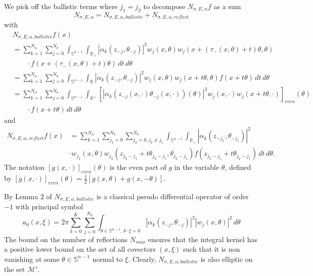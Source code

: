 \documentclass[10pt]{amsart}
\theoremstyle{definition}
\theoremstyle{definition}
\theoremstyle{definition}
\newcommand{ \rn }[1]{\mathbb{R}^{#1}}
\begin{document}
We pick off the ballistic terms where $j_{1}=j_{2}$ to decompose $N_{\sigma,E,\alpha}f$ as a sum
\begin{equation*}
N_{\sigma,E,\alpha} = N_{\sigma,E,\alpha, ballistic} + N_{\sigma,E,\alpha,reflect}
\end{equation*}
with
\begin{align*}
& N_{\sigma,E,\alpha,ballistic}f(x)\\
& = \sum_{k=1}^{N_{\alpha}}\sum_{j=0}^{N_{k}}\int_{\mathbb{S}^{n-1}}\int_{\mathbb{R}_{+}} |\alpha_{k}(z_{-j}, \theta_{-j})|^{2} w_{j}\left( x,\theta \right) w_{j}\left(x + (\tau_{-}(x,\theta)+t)\theta, \theta\right)\\
& \qquad \cdot f\left(x + (\tau_{-}(x,\theta)+t)\theta \right)\, dt\,d\theta\\
& = \sum_{k=1}^{N_{\alpha}}\sum_{j=0}^{N_k}\int_{\mathbb{S}^{n-1}}\int_{\mathbb{R}} |\alpha_{k}(z_{-j}, \theta_{-j})|^{2} w_{j}\left( x,\theta \right) w_{j}\left(x + t\theta, \theta\right)f\left(x + t\theta \right)\, dt\,d\theta\\
& = \sum_{k=1}^{N_{\alpha}}\sum_{j=0}^{N_k}\int_{\mathbb{S}^{n-1}}\int_{\rn{+}} \left[ |\alpha_{k}(z_{-j}(x,\cdot) \theta_{-j}(x,\cdot))(\theta)|^{2} w_{j}\left( x,\cdot \right) w_{j}\left(x + t\theta, \cdot \right)\right]_{even}(\theta)\\
& \qquad \cdot f\left(x + t\theta \right)\, dt\,d\theta
\end{align*}
and
\begin{align*}
N_{\sigma,E,\alpha,reflect}f(x) & = \sum_{k=1}^{N_{\alpha}}\sum_{j_{1}=0}^{N_{k}}\sum_{j_{2}=0, j_{2} \neq j_{1}}^{N_k}\int_{\mathbb{S}^{n-1}}\int_{\mathbb{R}_{+}} |\alpha_{k}(z_{-j_{1}}, \theta_{-j_{1}})|^{2}\\
& \cdot w_{j_{1}}\left( x,\theta \right) w_{j_{2}}\left(z_{j_{2}-j_{1}}+ t\theta_{j_{2}-j_{1}}, \theta_{j_{2}-j_{1}}\right)f\left(z_{j_{2}-j_{1}}+ t\theta_{j_{2}-j_{1}}\right)\, dt\,d\theta.
\end{align*}
The notation $\left[ g(x,\cdot) \right]_{even}(\theta)$ is the even part of $g$ in the variable $\theta$, defined by $\left[ g(x,\cdot)\right]_{even}(\theta) = \frac{1}{2}\left[ g(x,\theta) + g(x,-\theta) \right]$. 

By Lemma 2 of \cite{xraygeneric} $N_{\sigma,E,\alpha, ballistic}$ is a classical pseudo differential operator of order $-1$ with principal symbol
\begin{equation}
a_{0}(x,\xi) = 2\pi \sum_{k=0}^{K}\sum_{j=0}^{N_{k}}\int_{\theta \in \mathbb{S}^{n-1}, \, \theta \cdot \xi = 0}|\alpha_{k}(z_{-j}, \theta_{-j})|^{2} \left| w_{j}\left( x,\theta \right)\right|^2 \,d\theta
\end{equation}
The bound on the number of reflections $N_{max}$ ensures that the integral kernel has a positive lower bound on the set of all covectors $(x,\xi)$ such that it is non vanishing at some $\theta \in \mathbb{S}^{n-1}$ normal to $\xi$. Clearly, $N_{\sigma,E,\alpha,ballistic}$ is also elliptic on the set $\mathcal{M}'$.
\end{document}
